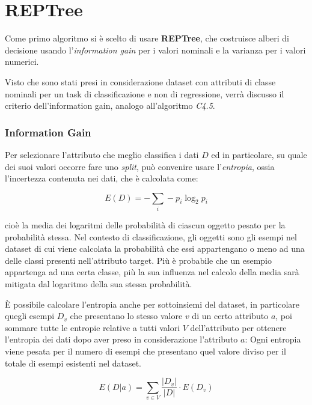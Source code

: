 \chapter{REPTree}
\label{(ch:reptree)}

Come primo algoritmo si è scelto di usare \textbf{REPTree}, che costruisce alberi di decisione usando l'\textit{information gain} per i valori nominali e la varianza per i valori numerici\cite{2Witten:2011:DMP:REPTree}.

Visto che sono stati presi in considerazione dataset con attributi di classe nominali per un task di classificazione e non di regressione, verrà discusso il criterio dell'information gain, analogo all'algoritmo \textit{C4.5}\cite{Quinlan:1993:CPM:152181}.

\subsection{Information Gain}
Per selezionare l'attributo che meglio classifica i dati $D$ ed in particolare, su quale dei suoi valori occorre fare uno \textit{split}, può convenire usare l'\emph{entropia}\cite{Shannon:1948}, ossia l'incertezza contenuta nei dati, che è calcolata come:

$$ E(D) = - \sum_{i} -p_i \log_2 p_i $$

cioè la media dei logaritmi delle probabilità di ciascun oggetto pesato per la probabilità stessa. Nel contesto di classificazione, gli oggetti sono gli esempi nel dataset di cui viene calcolata la probabilità che essi appartengano o meno ad una delle classi presenti nell'attributo target. Più è probabile che un esempio appartenga ad una certa classe, più la sua influenza nel calcolo della media sarà mitigata dal logaritmo della sua stessa probabilità.

È possibile calcolare l'entropia anche per sottoinsiemi del dataset, in particolare quegli esempi $D_v$ che presentano lo stesso valore $v$ di un certo attributo $a$, poi sommare tutte le entropie relative a tutti valori $V$ dell'attributo per ottenere l'entropia dei dati dopo aver preso in considerazione l'attributo $a$:
Ogni entropia viene pesata per il numero di esempi che presentano quel valore diviso per il totale di esempi esistenti nel dataset.

$$ E(D|a) = \sum_{v \in V} \frac{|D_v|}{|D|} \cdot E(D_v) $$
